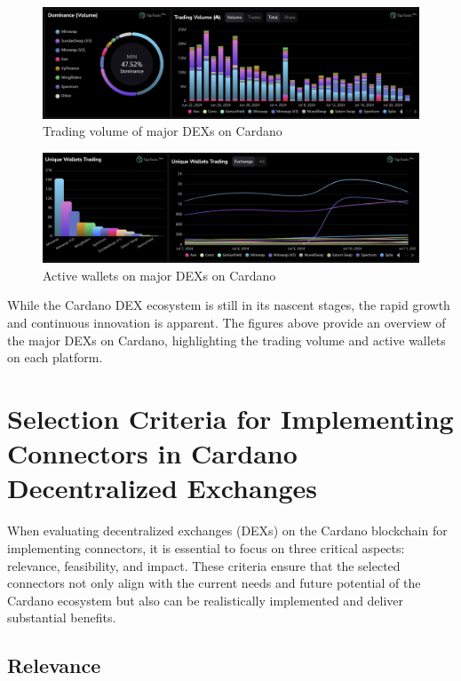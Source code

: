 \documentclass{scrreport}
\begin{document}
\begin{figure}[H]
  \centering
  \includegraphics[width=\textwidth]{CardanoDEXs - Volume.jpg}
  \caption{Trading volume of major DEXs on Cardano}
  \label{fig:cardano_dex}
\end{figure}


\begin{figure}[H]
  \centering
  \includegraphics[width=\textwidth]{CardanoDEXs - Wallets.jpg}
  \caption{Active wallets on major DEXs on Cardano}
  \label{fig:cardano_dex}
\end{figure}

While the Cardano DEX ecosystem is still in its nascent stages, the rapid growth and continuous innovation is apparent.
The figures above provide an overview of the major DEXs on Cardano, highlighting the trading volume and active wallets on each platform.


  \section{Selection Criteria for Implementing Connectors in Cardano Decentralized Exchanges}

  When evaluating decentralized exchanges (DEXs) on the Cardano blockchain for 
  implementing connectors, it is essential to focus on three critical aspects: 
  relevance, feasibility, and impact. These criteria ensure that the selected 
  connectors not only align with the current needs and future potential of the 
  Cardano ecosystem but also can be realistically implemented and deliver 
  substantial benefits.
  
  \subsection{Relevance}
  
\end{document}
